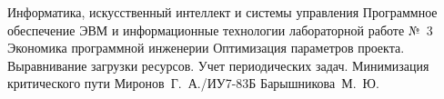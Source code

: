 \documentclass{bmstu}
\begin{document}
\makereporttitle
    {Информатика, искусственный интеллект и системы управления}
    {Программное обеспечение ЭВМ и информационные технологии}
    {лабораторной работе №~3}
    {Экономика программной инженерии}
    {Оптимизация параметров проекта. Выравнивание загрузки ресурсов. Учет периодических задач. Минимизация критического пути}
    {}
    {Миронов~Г.~А./ИУ7-83Б}
    {Барышникова~М.~Ю.}




\end{document}
